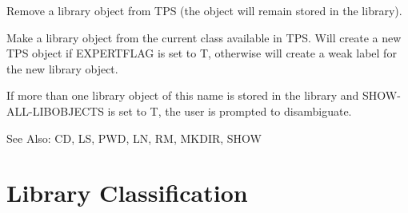 \begin{description} 
\item[DESTROY]  
Remove a library object from TPS (the object will remain
stored in the library).

\item[FETCH]  
Make a library object from the current class available in TPS.
Will create a new TPS object if EXPERTFLAG is set to T, otherwise
will create a weak label for the new library object.

If more than one library object of this name is stored in
the library and SHOW-ALL-LIBOBJECTS is set to T,
the user is prompted to disambiguate.

See Also: CD, LS, PWD, LN, RM, MKDIR, SHOW
\item
\end{description}

\section{Library Classification}


